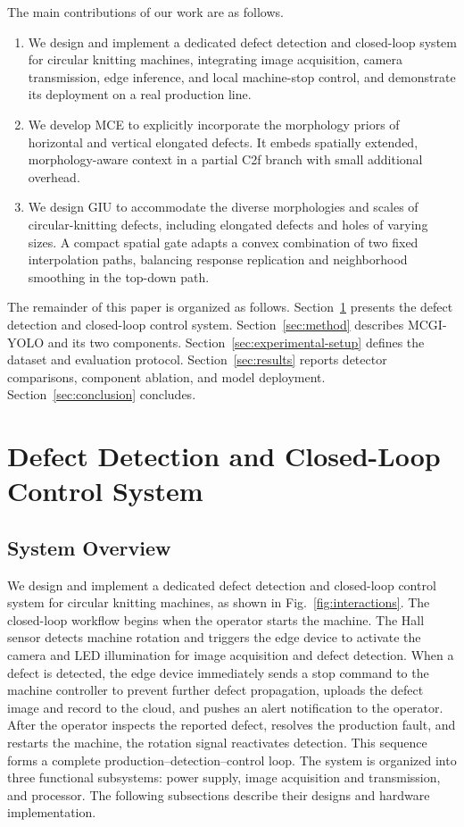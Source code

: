 \documentclass[journal]{IEEEtranTIE}
\begin{document}
The main contributions of our work are as follows.
\begin{enumerate}
  \renewcommand{\labelenumi}{\arabic{enumi})}
  \item We design and implement a dedicated defect detection and closed-loop system for circular knitting machines, integrating image acquisition, camera transmission, edge inference, and local machine-stop control, and demonstrate its deployment on a real production line.
  \item We develop MCE to explicitly incorporate the morphology priors of horizontal and vertical elongated defects. It embeds spatially extended, morphology-aware context in a partial C2f branch with small additional overhead.
  \item We design GIU to accommodate the diverse morphologies and scales of circular-knitting defects, including elongated defects and holes of varying sizes. A compact spatial gate adapts a convex combination of two fixed interpolation paths, balancing response replication and neighborhood smoothing in the top-down path.
\end{enumerate}

The remainder of this paper is organized as follows. Section~\ref{sec:system-design} presents the defect detection and closed-loop control system. Section~\ref{sec:method} describes MCGI-YOLO and its two components. Section~\ref{sec:experimental-setup} defines the dataset and evaluation protocol. Section~\ref{sec:results} reports detector comparisons, component ablation, and model deployment. Section~\ref{sec:conclusion} concludes.

\section{Defect Detection and Closed-Loop Control System}
\label{sec:system-design}
\subsection{System Overview}
\label{sec:system-overview}
We design and implement a dedicated defect detection and closed-loop control system for circular knitting machines, as shown in Fig.~\ref{fig:interactions}. The closed-loop workflow begins when the operator starts the machine. The Hall sensor detects machine rotation and triggers the edge device to activate the camera and LED illumination for image acquisition and defect detection. When a defect is detected, the edge device immediately sends a stop command to the machine controller to prevent further defect propagation, uploads the defect image and record to the cloud, and pushes an alert notification to the operator. After the operator inspects the reported defect, resolves the production fault, and restarts the machine, the rotation signal reactivates detection. This sequence forms a complete production–detection–control loop. The system is organized into three functional subsystems: power supply, image acquisition and transmission, and processor. The following subsections describe their designs and hardware implementation.
\end{document}
